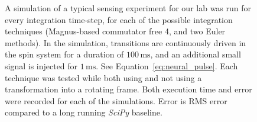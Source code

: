 \documentclass{jors}
\begin{document}
\begin{figure}[h!]
{			A simulation of a typical sensing experiment for our lab was run for every integration time-step, for each of the possible integration techniques (Magnus-based commutator free 4, and two Euler methods).
			In the simulation, transitions are continuously driven in the spin system for a duration of $ 100 \,\text{ms} $, and an additional small signal is injected for $ 1\,\text{ms} $.
			See Equation~\eqref{eq:neural_pulse}.
			Each technique was tested while both using and not using a transformation into a rotating frame.
			Both execution time and error were recorded for each of the simulations.
			Error is RMS error compared to a long running \emph{SciPy} baseline.}
			\label{fig:benchmark_spin}
		\end{figure}
\end{document}
